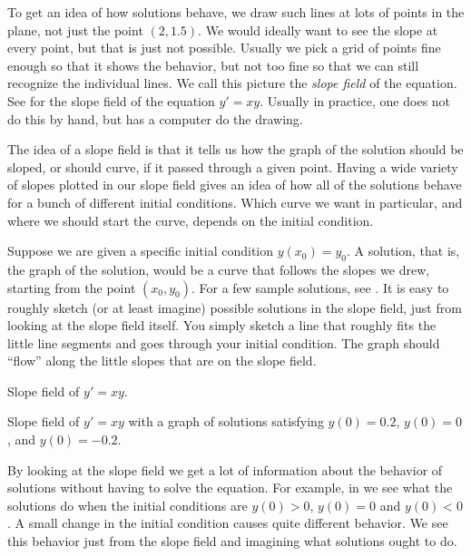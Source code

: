 \documentclass{ximera}
\begin{document}
To get an idea of how solutions behave, we draw such lines at lots of points in the plane, not just the point $(2,1.5)$.  We would ideally want to see the slope at every point, but that is just not possible.  Usually we pick a grid of points fine enough so that it shows the behavior, but not too fine so that we can still recognize the individual lines. We call this picture the \emph{slope field} of the equation. See  for the slope field of the equation $y' = xy$. Usually in practice, one does not do this by hand, but has a computer do the drawing.

The idea of a slope field is that it tells us how the graph of the solution should be sloped, or should curve, if it passed through a given point. Having a wide variety of slopes plotted in our slope field gives an idea of how all of the solutions behave for a bunch of different initial conditions. Which curve we want in particular, and where we should start the curve, depends on the initial condition. 

Suppose we are given a specific initial condition $y(x_0) = y_0$. A solution, that is, the graph of the solution, would be a curve that follows the slopes we drew, starting from the point $(x_0, y_0)$.  For a few sample solutions, see .  It is easy to roughly sketch (or at least imagine) possible solutions in the slope field, just from looking at the slope field itself.  You simply sketch a line that roughly fits the little line segments and goes through your initial condition. The graph should ``flow'' along the little slopes that are on the slope field. 

\begin{myfig}
    \parbox[t]{2.5in}{\capstart%
     \caption{Slope field of $y' = xy$.\label{1.3:fig1}} 
     }
    \quad \qquad
    \parbox[t]{2.5in}{ \capstart
     \caption{Slope field of $y' = xy$ with a graph of solutions satisfying
     $y(0) = 0.2$, $y(0) = 0$, and $y(0) = -0.2$.\label{1.3:fig2}}
    }
\end{myfig}

By looking at the slope field we get a lot of information about the behavior of solutions without having to solve the equation.  For example, in  we see what the solutions do when the initial conditions are $y(0) > 0$, $y(0) = 0$ and $y(0) < 0$. A small change in the initial condition causes quite different behavior. We see this behavior just from the slope field and imagining what solutions ought to do.
\end{document}
